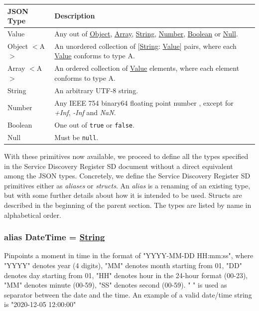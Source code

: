 \documentclass[a4paper]{arrowhead}
\newcommand{\pdef}[1]{{\textcolor{ArrowheadGrey}{#1 \label{sec:model:primitives:#1} \label{sec:model:primitives:#1s}}}}
\newcommand{\pref}[1]{{\textcolor{ArrowheadGrey}{\hyperref[sec:model:primitives:#1]{#1}}}}
\begin{document}
\begin{table}[ht!]
\begin{tabularx}{\textwidth}{| p{3cm} | X |} \hline
\rowcolor{gray!33} JSON Type & Description \\ \hline
\pdef{Value}                 & Any out of \pref{Object}, \pref{Array}, \pref{String}, \pref{Number}, \pref{Boolean} or \pref{Null}. \\ \hline
\pdef{Object}$<$A$>$         & An unordered collection of $[$\pref{String}: \pref{Value}$]$ pairs, where each \pref{Value} conforms to type A. \\ \hline
\pdef{Array}$<$A$>$          & An ordered collection of \pref{Value} elements, where each element conforms to type A. \\ \hline
\pdef{String}                & An arbitrary UTF-8 string. \\ \hline
\pdef{Number}                & Any IEEE 754 binary64 floating point number \cite{cowlishaw2019floating}, except for \textit{+Inf}, \textit{-Inf} and \textit{NaN}. \\ \hline
\pdef{Boolean}               & One out of \texttt{true} or \texttt{false}. \\ \hline
\pdef{Null}                  & Must be \texttt{null}. \\ \hline
\end{tabularx}
\end{table}

With these primitives now available, we proceed to define all the types specified in the Service Discovery Register SD document without a direct equivalent among the JSON types.
Concretely, we define the Service Discovery Register SD primitives either as \textit{aliases} or \textit{structs}.
An \textit{alias} is a renaming of an existing type, but with some further details about how it is intended to be used.
Structs are described in the beginning of the parent section.
The types are listed by name in alphabetical order.

\subsubsection{alias \pdef{DateTime} = \pref{String}}

Pinpoints a moment in time in the format of "YYYY-MM-DD HH:mm:ss", where "YYYY" denotes year (4 digits), "MM" denotes month starting from 01, "DD" denotes day starting from 01, "HH" denotes hour in the 24-hour format (00-23), "MM" denotes minute (00-59), "SS" denotes second (00-59). " " is used as separator between the date and the time.
An example of a valid date/time string is "2020-12-05 12:00:00"
\end{document}
